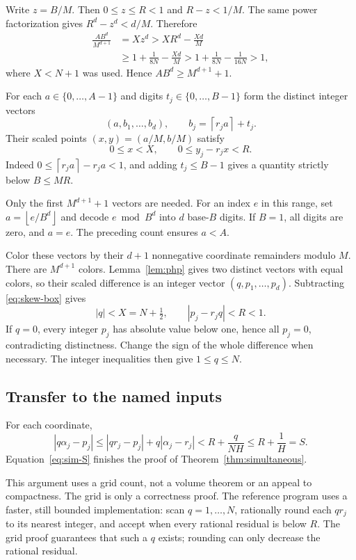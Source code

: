 \documentclass[11pt]{article}
\theoremstyle{definition}\newtheorem{definition}[theorem]{Definition}
\theoremstyle{remark}\newtheorem{remark}[theorem]{Remark}
\newcommand{\floor}[1]{\left\lfloor#1\right\rfloor}
\newcommand{\ceil}[1]{\left\lceil#1\right\rceil}
\begin{document}
Write $z=B/M$. Then $0\le z\le R<1$ and $R-z<1/M$. The same power factorization gives $R^d-z^d<d/M$. Therefore
\begin{align*}
 \frac{AB^d}{M^{d+1}}
 &=Xz^d>XR^d-\frac{Xd}M\\
 &\ge1+\frac1{8N}-\frac{Xd}M
 >1+\frac1{8N}-\frac1{16N}>1,
\end{align*}
where $X<N+1$ was used. Hence $AB^d\ge M^{d+1}+1$.

For each $a\in\{0,\ldots,A-1\}$ and digits $t_j\in\{0,\ldots,B-1\}$ form the distinct integer vectors
\[
 (a,b_1,\ldots,b_d),\qquad b_j=\ceil{r_j a}+t_j.
\]
Their scaled points $(x,y)=(a/M,b/M)$ satisfy
\begin{equation}\label{eq:skew-box}
 0\le x<X,\qquad 0\le y_j-r_jx<R.
\end{equation}
Indeed $0\le\ceil{r_j a}-r_j a<1$, and adding $t_j\le B-1$ gives a quantity strictly below $B\le MR$.

Only the first $M^{d+1}+1$ vectors are needed. For an index $e$ in this range, set $a=\floor{e/B^d}$ and decode $e\bmod B^d$ into $d$ base-$B$ digits. If $B=1$, all digits are zero, and $a=e$. The preceding count ensures $a<A$.

Color these vectors by their $d+1$ nonnegative coordinate remainders modulo $M$. There are $M^{d+1}$ colors. Lemma~\ref{lem:php} gives two distinct vectors with equal colors, so their scaled difference is an integer vector $(q,p_1,\ldots,p_d)$. Subtracting \eqref{eq:skew-box} gives
\[
 |q|<X=N+\tfrac12,\qquad |p_j-r_jq|<R<1.
\]
If $q=0$, every integer $p_j$ has absolute value below one, hence all $p_j=0$, contradicting distinctness. Change the sign of the whole difference when necessary. The integer inequalities then give $1\le q\le N$.

\subsection{Transfer to the named inputs}

For each coordinate,
\[
 |q\alpha_j-p_j|
 \le |qr_j-p_j|+q|\alpha_j-r_j|
 <R+\frac q{NH}\le R+\frac1H=S.
\]
Equation~\eqref{eq:sim-S} finishes the proof of Theorem~\ref{thm:simultaneous}.

This argument uses a grid count, not a volume theorem or an appeal to compactness. The grid is only a correctness proof. The reference program uses a faster, still bounded implementation: scan $q=1,\ldots,N$, rationally round each $qr_j$ to its nearest integer, and accept when every rational residual is below $R$. The grid proof guarantees that such a $q$ exists; rounding can only decrease the rational residual.
\end{document}
